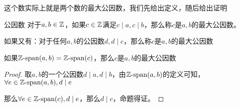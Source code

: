 \documentclass[12pt, a4paper, oneside, UTF8]{ctexbook}
\begin{document}
			这个数实际上就是两个数的最大公因数，我们先给出定义，随后给出证明
			\begin{defn}{公因数}
				对于$a,b \in \mathbb{Z}$，如果$c\in\mathbb{Z}$满足$c\mid a,c\mid b$，那么称$c$是$a,b$的最大公因数。
				
				如果又有：对于任何$a,b$的公因数$d,d \mid c$，那么称$c$是$a,b$的最大公因数
			\end{defn}
			\begin{lemma}{}{}
				如果$\mathbb{Z}\text{-span}(a,b)=\mathbb{Z}\text{-span}(c)$，那么$c$是$a,b$的最大公因数
			\end{lemma}
			\begin{proof}
				取$a,b$的一个公因数$d\mid a,d\mid b$，由$\mathbb{Z}\text{-span}(a,b)$的定义可知，$\forall e \in \mathbb{Z}\text{-span}(a,b),d \mid e$
				
				那么$\forall e \in \mathbb{Z}\text{-span}(c),d \mid e$，那么$d \mid c$，命题得证。
			\end{proof}
\ifx\allfiles\undefined
\end{document}
